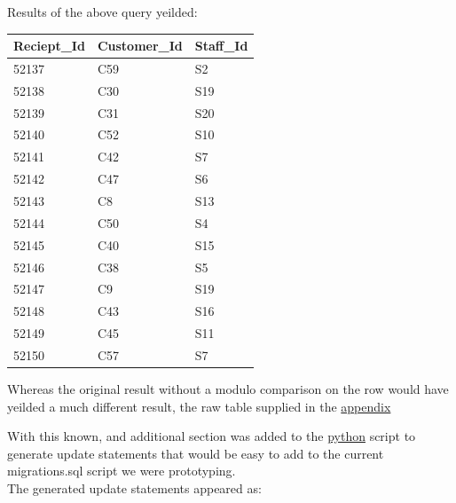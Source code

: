 \documentclass{article}
\begin{document}
            Results of the above query yeilded:
            \begin{table}[H]
                \centering
                \begin{tabular}{|l|l|l|}
                \hline
                Reciept\_Id & Customer\_Id & Staff\_Id \\ \hline
                52137       & C59          & S2        \\ \hline
                52138       & C30          & S19       \\ \hline
                52139       & C31          & S20       \\ \hline
                52140       & C52          & S10       \\ \hline
                52141       & C42          & S7        \\ \hline
                52142       & C47          & S6        \\ \hline
                52143       & C8           & S13       \\ \hline
                52144       & C50          & S4        \\ \hline
                52145       & C40          & S15       \\ \hline
                52146       & C38          & S5        \\ \hline
                52147       & C9           & S19       \\ \hline
                52148       & C43          & S16       \\ \hline
                52149       & C45          & S11       \\ \hline
                52150       & C57          & S7        \\ \hline
                \end{tabular}
            \end{table}

            \newpage
            
            Whereas the original result without a modulo comparison on the row would have yeilded
            a much different result, the raw table supplied in the \hyperref[sec:CTEResults]{\color{blue}appendix}
            \par
            With this known, and additional section was added to the \hyperref[sec:Python]{\color{blue}python} script to generate update statements
            that would be easy to add to the current migrations.sql script we were prototyping.
            \\
            The generated update statements appeared as:
\end{document}
